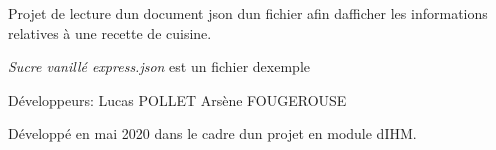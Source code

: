 Projet de lecture d\textquotesingle{}un document json d\textquotesingle{}un fichier afin d\textquotesingle{}afficher les informations relatives à une recette de cuisine.

{\itshape Sucre vanillé express.\+json} est un fichier d\textquotesingle{}exemple

Développeurs\+: Lucas P\+O\+L\+L\+ET Arsène F\+O\+U\+G\+E\+R\+O\+U\+SE

Développé en mai 2020 dans le cadre d\textquotesingle{}un projet en module d\textquotesingle{}I\+HM. 